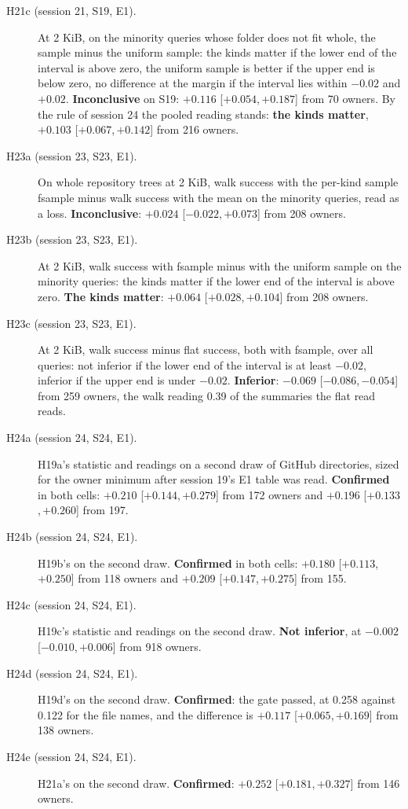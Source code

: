 \documentclass[11pt]{article}
\newcommand{\ci}[2]{[\ensuremath{#1},\,\ensuremath{#2}]}  %
\begin{document}
\begin{description}
\item[H21c (session 21, S19, E1).] At 2 KiB, on the minority queries whose folder does not fit whole, the sample minus the uniform sample: the kinds matter if the lower end of the interval is above zero, the uniform sample is better if the upper end is below zero, no difference at the margin if the interval lies within $-0.02$ and $+0.02$. \textbf{Inconclusive} on S19: $+0.116$ \ci{+0.054}{+0.187} from 70 owners. By the rule of session 24 the pooled reading stands: \textbf{the kinds matter}, $+0.103$ \ci{+0.067}{+0.142} from 216 owners.
\item[H23a (session 23, S23, E1).] On whole repository trees at 2 KiB, walk success with the per-kind sample fsample minus walk success with the mean on the minority queries, read as a loss. \textbf{Inconclusive}: $+0.024$ \ci{-0.022}{+0.073} from 208 owners.
\item[H23b (session 23, S23, E1).] At 2 KiB, walk success with fsample minus with the uniform sample on the minority queries: the kinds matter if the lower end of the interval is above zero. \textbf{The kinds matter}: $+0.064$ \ci{+0.028}{+0.104} from 208 owners.
\item[H23c (session 23, S23, E1).] At 2 KiB, walk success minus flat success, both with fsample, over all queries: not inferior if the lower end of the interval is at least $-0.02$, inferior if the upper end is under $-0.02$. \textbf{Inferior}: $-0.069$ \ci{-0.086}{-0.054} from 259 owners, the walk reading 0.39 of the summaries the flat read reads.
\item[H24a (session 24, S24, E1).] H19a's statistic and readings on a second draw of GitHub directories, sized for the owner minimum after session 19's E1 table was read. \textbf{Confirmed} in both cells: $+0.210$ \ci{+0.144}{+0.279} from 172 owners and $+0.196$ \ci{+0.133}{+0.260} from 197.
\item[H24b (session 24, S24, E1).] H19b's on the second draw. \textbf{Confirmed} in both cells: $+0.180$ \ci{+0.113}{+0.250} from 118 owners and $+0.209$ \ci{+0.147}{+0.275} from 155.
\item[H24c (session 24, S24, E1).] H19c's statistic and readings on the second draw. \textbf{Not inferior}, at $-0.002$ \ci{-0.010}{+0.006} from 918 owners.
\item[H24d (session 24, S24, E1).] H19d's on the second draw. \textbf{Confirmed}: the gate passed, at 0.258 against 0.122 for the file names, and the difference is $+0.117$ \ci{+0.065}{+0.169} from 138 owners.
\item[H24e (session 24, S24, E1).] H21a's on the second draw. \textbf{Confirmed}: $+0.252$ \ci{+0.181}{+0.327} from 146 owners.

\end{description}
\end{document}
